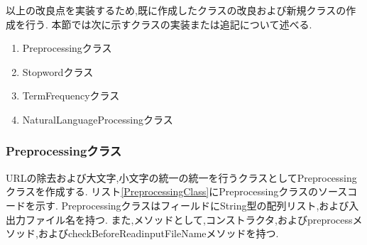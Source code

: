 \documentclass[a4j]{jarticle}
\begin{document}
以上の改良点を実装するため,既に作成したクラスの改良および新規クラスの作成を行う.
本節では次に示すクラスの実装または追記について述べる.
\begin{enumerate}
	\item Preprocessingクラス
	\item Stopwordクラス
	\item TermFrequencyクラス
	\item NaturalLanguageProcessingクラス
\end{enumerate}

\subsubsection{Preprocessingクラス}
URLの除去および大文字,小文字の統一の統一を行うクラスとしてPreprocessingクラスを作成する.
リスト\ref{PreprocessingClass}にPreprocessingクラスのソースコードを示す.
PreprocessingクラスはフィールドにString型の配列リスト,および入出力ファイル名を持つ.
また,メソッドとして,コンストラクタ,およびpreprocessメソッド,およびcheckBeforeReadinputFileNameメソッドを持つ.
\end{document}
